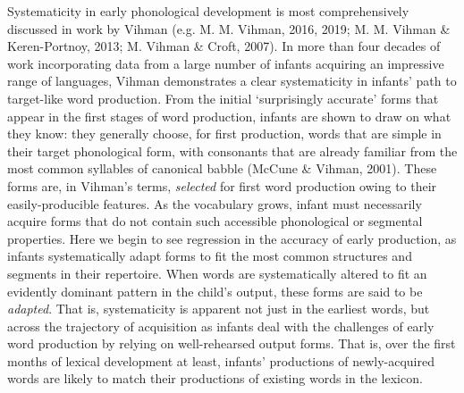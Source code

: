 \documentclass[
  man]{apa6}
\begin{document}
Systematicity in early phonological development is most comprehensively discussed in work by Vihman (e.g. M. M. Vihman, 2016, 2019; M. M. Vihman \& Keren-Portnoy, 2013; M. Vihman \& Croft, 2007). In more than four decades of work incorporating data from a large number of infants acquiring an impressive range of languages, Vihman demonstrates a clear systematicity in infants' path to target-like word production. From the initial `surprisingly accurate' forms that appear in the first stages of word production, infants are shown to draw on what they know: they generally choose, for first production, words that are simple in their target phonological form, with consonants that are already familiar from the most common syllables of canonical babble (McCune \& Vihman, 2001). These forms are, in Vihman's terms, \emph{selected} for first word production owing to their easily-producible features. As the vocabulary grows, infant must necessarily acquire forms that do not contain such accessible phonological or segmental properties. Here we begin to see regression in the accuracy of early production, as infants systematically adapt forms to fit the most common structures and segments in their repertoire. When words are systematically altered to fit an evidently dominant pattern in the child's output, these forms are said to be \emph{adapted}. That is, systematicity is apparent not just in the earliest words, but across the trajectory of acquisition as infants deal with the challenges of early word production by relying on well-rehearsed output forms. That is, over the first months of lexical development at least, infants' productions of newly-acquired words are likely to match their productions of existing words in the lexicon.
\end{document}
